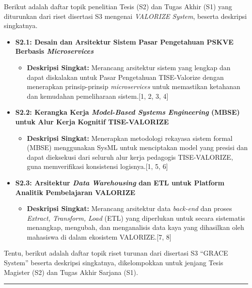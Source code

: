 \documentclass[
  letterpaper,
  DIV=11,
  numbers=noendperiod]{scrreprt}
\providecommand{\tightlist}{%
  \setlength{\itemsep}{0pt}\setlength{\parskip}{0pt}}
\begin{document}
Berikut adalah daftar topik penelitian Tesis (S2) dan Tugas Akhir (S1)
yang diturunkan dari riset disertasi S3 mengenai \emph{VALORIZE System},
beserta deskripsi singkatnya.

\begin{itemize}
\tightlist
\item
  \textbf{S2.1: Desain dan Arsitektur Sistem Pasar Pengetahuan PSKVE
  Berbasis \emph{Microservices}}

  \begin{itemize}
  \tightlist
  \item
    \textbf{Deskripsi Singkat:} Merancang arsitektur sistem yang lengkap
    dan dapat diskalakan untuk Pasar Pengetahuan TISE-Valorize dengan
    menerapkan prinsip-prinsip \emph{microservices} untuk memastikan
    ketahanan dan kemudahan pemeliharaan sistem.{[}1, 2, 3, 4{]}
  \end{itemize}
\item
  \textbf{S2.2: Kerangka Kerja \emph{Model-Based Systems Engineering}
  (MBSE) untuk Alur Kerja Kognitif TISE-VALORIZE}

  \begin{itemize}
  \tightlist
  \item
    \textbf{Deskripsi Singkat:} Menerapkan metodologi rekayasa sistem
    formal (MBSE) menggunakan SysML untuk menciptakan model yang presisi
    dan dapat dieksekusi dari seluruh alur kerja pedagogis
    TISE-VALORIZE, guna memverifikasi konsistensi logisnya.{[}1, 5, 6{]}
  \end{itemize}
\item
  \textbf{S2.3: Arsitektur \emph{Data Warehousing} dan ETL untuk
  Platform Analitik Pembelajaran VALORIZE}

  \begin{itemize}
  \tightlist
  \item
    \textbf{Deskripsi Singkat:} Merancang arsitektur data
    \emph{back-end} dan proses \emph{Extract, Transform, Load} (ETL)
    yang diperlukan untuk secara sistematis menangkap, mengubah, dan
    menganalisis data kaya yang dihasilkan oleh mahasiswa di dalam
    ekosistem VALORIZE.{[}7, 8{]}
  \end{itemize}
\end{itemize}

Tentu, berikut adalah daftar topik riset turunan dari disertasi S3
``GRACE System'' beserta deskripsi singkatnya, dikelompokkan untuk
jenjang Tesis Magister (S2) dan Tugas Akhir Sarjana (S1).

\begin{center}\rule{0.5\linewidth}{0.5pt}\end{center}
\end{document}
